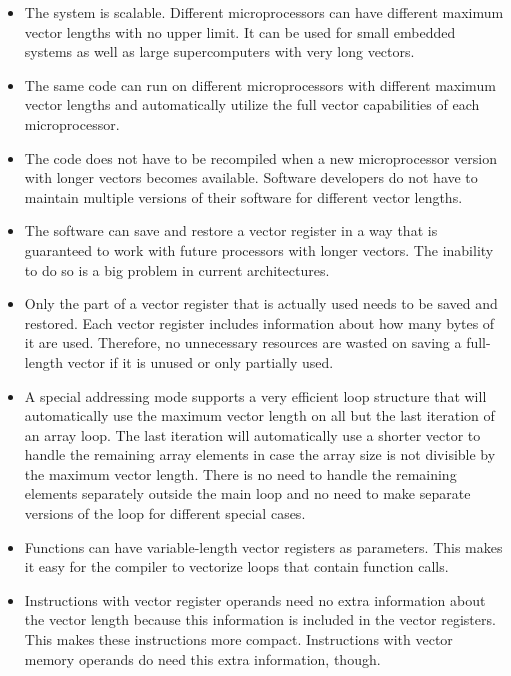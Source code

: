 \documentclass[forwardcom.tex]{subfiles}
\begin{document}
\begin{itemize}
\item The system is scalable. Different microprocessors can have different maximum vector lengths with no upper limit. It can be used for small embedded systems as well as large supercomputers with very long vectors. 

\item The same code can run on different microprocessors with different maximum vector lengths and automatically utilize the full vector capabilities of each microprocessor. 

\item The code does not have to be recompiled when a new microprocessor version with longer vectors becomes available. Software developers do not have to maintain multiple versions of their software for different vector lengths. 

\item The software can save and restore a vector register in a way that is guaranteed to work with future processors with longer vectors. The inability to do so is a big problem in current architectures. 

\item Only the part of a vector register that is actually used needs to be saved and restored. Each vector register includes information about how many bytes of it are used. Therefore, no unnecessary resources are wasted on saving a full-length vector if it is unused or only partially used. 

\item A special addressing mode supports a very efficient loop structure that will automatically use the maximum vector length on all but the last iteration of an array loop. The last iteration will automatically use a shorter vector to handle the remaining array elements in case the array size is not divisible by the maximum vector length. There is no need to handle the remaining elements separately outside the main loop and no need to make separate versions of the loop for different special cases. 

\item Functions can have variable-length vector registers as parameters. This makes it easy for the compiler to vectorize loops that contain function calls. 

\item Instructions with vector register operands need no extra information about the vector length because this information is included in the vector registers. This makes these instructions more compact. Instructions with vector memory operands do need this extra information, though.


\end{itemize}
\end{document}
